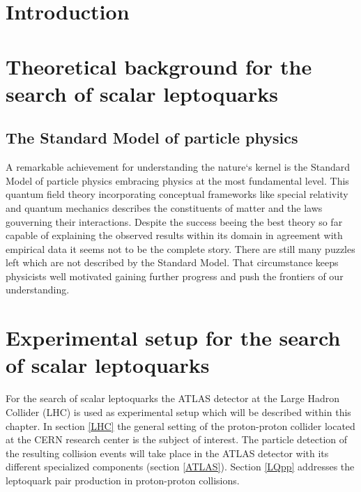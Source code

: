 \chapter{Introduction}
\chapter{Theoretical background for the search of scalar leptoquarks}\label{theory}
\section{The Standard Model of particle physics}\label{SM}
A remarkable achievement for understanding the nature`s kernel is the Standard Model of particle physics embracing physics at the most fundamental level. This quantum field theory incorporating conceptual frameworks like special relativity and quantum mechanics describes the constituents of matter and the laws gouverning their interactions. \cite{Mann} Despite the success beeing the best theory so far capable of explaining the observed results within its domain in agreement with empirical data it seems not to be the complete story. There are still many puzzles left which are not described by the Standard Model. That circumstance keeps physicists well motivated gaining further progress and push the frontiers of our understanding. \cite{Nair}\par
\chapter{Experimental setup for the search of scalar leptoquarks}\label{experiment}
For the search of scalar leptoquarks the ATLAS detector at the Large Hadron Collider (LHC) is used as experimental setup which will be described within this chapter. In section \ref{LHC} the general setting of the proton-proton collider located at the CERN research center is the subject of interest. The particle detection of the resulting collision events will take place in the ATLAS detector with its different specialized components (section \ref{ATLAS}). Section \ref{LQpp} addresses the leptoquark pair production in proton-proton collisions.  
